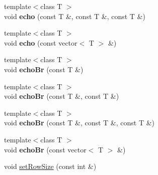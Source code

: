 \begin{DoxyCompactItemize}
\item 
\hypertarget{classHelper_ac9ac701a452f70e6152fc82e4a5b85cd}{
{\footnotesize template$<$class T $>$ }\\void {\bfseries echo} (const T \&, const T \&, const T \&)}
\label{classHelper_ac9ac701a452f70e6152fc82e4a5b85cd}

\item 
\hypertarget{classHelper_a72084537a2a235f736291ea721987fdb}{
{\footnotesize template$<$class T $>$ }\\void {\bfseries echo} (const vector$<$ T $>$ \&)}
\label{classHelper_a72084537a2a235f736291ea721987fdb}

\item 
\hypertarget{classHelper_ab786004c90c51a1d9c9e2ad36d8cbf48}{
{\footnotesize template$<$class T $>$ }\\void {\bfseries echoBr} (const T \&)}
\label{classHelper_ab786004c90c51a1d9c9e2ad36d8cbf48}

\item 
\hypertarget{classHelper_a0946a5919cc940688ac9bf9558f8b94d}{
{\footnotesize template$<$class T $>$ }\\void {\bfseries echoBr} (const T \&, const T \&)}
\label{classHelper_a0946a5919cc940688ac9bf9558f8b94d}

\item 
\hypertarget{classHelper_adf59e8bb5b7a273784fe853c8c0d9760}{
{\footnotesize template$<$class T $>$ }\\void {\bfseries echoBr} (const T \&, const T \&, const T \&)}
\label{classHelper_adf59e8bb5b7a273784fe853c8c0d9760}

\item 
\hypertarget{classHelper_abe69ddfd23f6d1f557e145e50def8ac6}{
{\footnotesize template$<$class T $>$ }\\void {\bfseries echoBr} (const vector$<$ T $>$ \&)}
\label{classHelper_abe69ddfd23f6d1f557e145e50def8ac6}

\item 
void \hyperlink{classHelper_af4fcef11ef8f781c90cee2ba176ec521}{setRowSize} (const int \&)
\end{DoxyCompactItemize}
